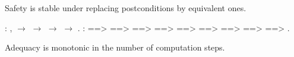 \documentclass[12pt]{report}
\begin{document}
Safety is stable under replacing postconditions by equivalent ones. \begin{coqdoccode}
\coqdocemptyline
\coqdocnoindent
{}  :\coqdoceol
\coqdocindent{1.00em}
\coqdockw{\ensuremath{\forall}}          ,\coqdoceol
\coqdocindent{1.00em}
  \ensuremath{\rightarrow}\coqdoceol
\coqdocindent{1.00em}
  \ensuremath{\rightarrow}\coqdoceol
\coqdocindent{1.00em}
   \ensuremath{\rightarrow}\coqdoceol
\coqdocindent{1.00em}
          \ensuremath{\rightarrow}\coqdoceol
\coqdocindent{1.00em}
         .\coqdoceol
\coqdocemptyline
\coqdocnoindent
{}   : \coqdoceol
\coqdocindent{1.00em}
   ==>  ==>  ==>  ==>  ==>  ==>  ==>  ==>  ==> \coqdoceol
\coqdocindent{2.00em}
 .\coqdoceol
\coqdocemptyline
\end{coqdoccode}
Adequacy is monotonic in the number of computation steps. 
\end{document}
